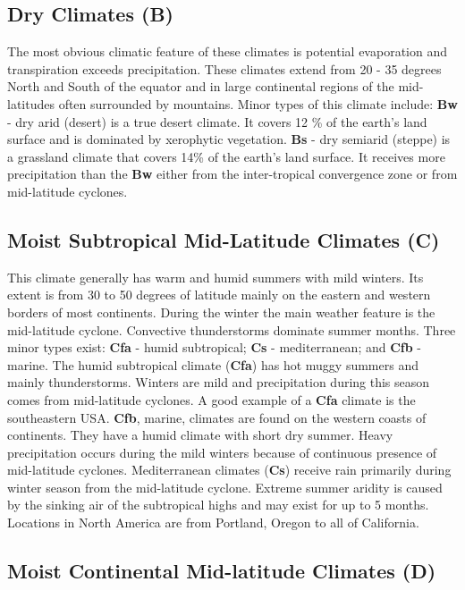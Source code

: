 \subsection{Dry Climates (B)}\label{dry-climates-b}

The most obvious climatic feature of these climates is potential evaporation and transpiration exceeds precipitation. These climates extend from 20 - 35 degrees North and South of the equator and in large continental regions of the mid-latitudes often surrounded by mountains. Minor types of this climate include: \textbf{Bw} - dry arid (desert) is a true desert climate. It covers 12 \% of the earth's land surface and is dominated by xerophytic vegetation. \textbf{Bs} - dry semiarid (steppe) is a grassland climate that covers 14\% of the earth's land surface. It receives more precipitation than the \textbf{Bw} either from the inter-tropical convergence zone or from mid-latitude cyclones.

\subsection{Moist Subtropical Mid-Latitude Climates (C)}\label{moist-subtropical-mid-latitude-climates-c}

This climate generally has warm and humid summers with mild winters. Its extent is from 30 to 50 degrees of latitude mainly on the eastern and western borders of most continents. During the winter the main weather feature is the mid-latitude cyclone. Convective thunderstorms dominate summer months. Three minor types exist: \textbf{Cfa} - humid subtropical; \textbf{Cs} - mediterranean; and \textbf{Cfb} - marine. The humid subtropical climate (\textbf{Cfa}) has hot muggy summers and mainly thunderstorms. Winters are mild and precipitation during this season comes from mid-latitude cyclones. A good example of a \textbf{Cfa} climate is the southeastern USA. \textbf{Cfb}, marine, climates are found on the western coasts of continents. They have a humid climate with short dry summer. Heavy precipitation occurs during the mild winters because of continuous presence of mid-latitude cyclones. Mediterranean climates (\textbf{Cs}) receive rain primarily during winter season from the mid-latitude cyclone. Extreme summer aridity is caused by the sinking air of the subtropical highs and may exist for up to 5 months. Locations in North America are from Portland, Oregon to all of California.

\subsection{Moist Continental Mid-latitude Climates (D)}\label{moist-continental-mid-latitude-climates-d}


